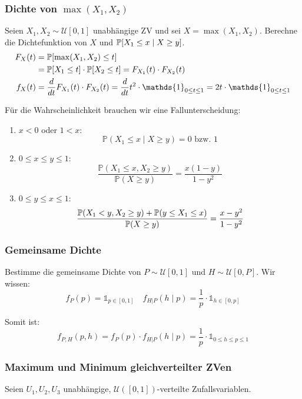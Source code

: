 \subsubsection*{\texorpdfstring{Dichte von \(\max(X_1,X_2)\)}{Dichte von max()}}

Seien \(X_1, X_2 \sim \mathcal{U}[0,1]\) unabhängige ZV und sei \(X = \max (X_1, X_2)\). Berechne die Dichtefunktion von \(X\) und \(\P[X_1 \leq x \mid X \geq y]\).
\begin{align*}
	F_X(t) & = \P[\max(X_1, X_2) \leq t]                                                                                                              \\ &= \P[X_1 \leq t] \cdot \P[X_2 \leq t] = F_{X_1}(t) \cdot F_{X_2}(t) \\
	f_X(t) & = \frac{d}{dt} F_{X_1}(t) \cdot F_{X_2}(t) = \frac{d}{dt} t^2 \cdot \mathds{1}_{0 \leq t \leq 1} = 2t \cdot \mathds{1}_{0 \leq t \leq 1}
\end{align*}

Für die Wahrscheinlichkeit brauchen wir eine Fallunterscheidung: \smallskip

\begin{enumerate}
	\item \(x < 0\) oder \(1 < x\):
	      \[\mathbb{P}(X_1 \leq x \mid X \geq y) = 0 \text{ bzw. } 1\]
	\item \(0 \leq x \leq y \leq 1\):
	      \[\frac{\mathbb{P}(X_1 \leq x, X_2 \geq y)}{\mathbb{P}(X \geq y)} = \frac{x(1-y)}{1 - y^2}\]
	\item \(0 \leq y \leq x \leq 1\):
	      \[\frac{\mathbb{P}(X_1 < y, X_2 \geq y) + \P(y \leq X_1 \leq x)}{\mathbb{P}(X \geq y)} = \frac{x - y^2}{1 - y^2}\]
\end{enumerate}

\subsubsection*{Gemeinsame Dichte}

Bestimme die gemeinsame Dichte von \(P \sim \mathcal{U}[0,1]\) und \(H \sim \mathcal{U}[0,P]\). Wir wissen:
\[f_P(p) = \mathds{1}_{p \in [0,1]} \quad f_{H | P}(h \mid p) = \frac{1}{p} \cdot \mathds{1}_{h \in [0,p]}\]

\noindent
Somit ist:
\[f_{P, H} (p, h) = f_P(p) \cdot f_{H | P}(h \mid p) = \frac{1}{p} \cdot \mathds{1}_{0 \leq h \leq p \leq 1}\]

\subsubsection*{Maximum und Minimum gleichverteilter ZVen}
Seien $U_1, U_2, U_3$ unabhängige, $\mathcal{U}([0,1])$-verteilte Zufallsvariablen. 

